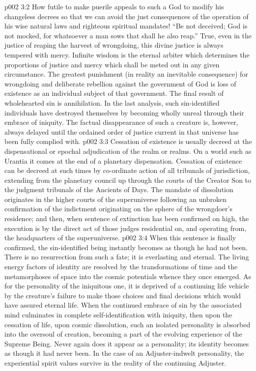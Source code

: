 \vs p002 3:2 \pc How futile to make puerile appeals to such a God to modify his changeless decrees so that we can avoid the just consequences of the operation of his wise natural laws and righteous spiritual mandates! “Be not deceived; God is not mocked, for whatsoever a man sows that shall he also reap.” True, even in the justice of reaping the harvest of wrongdoing, this divine justice is always tempered with mercy. Infinite wisdom is the eternal arbiter which determines the proportions of justice and mercy which shall be meted out in any given circumstance. The greatest punishment (in reality an inevitable consequence) for wrongdoing and deliberate rebellion against the government of God is loss of existence as an individual subject of that government. The final result of wholehearted sin is annihilation. In the last analysis, such sin\hyp{}identified individuals have destroyed themselves by becoming wholly unreal through their embrace of iniquity. The factual disappearance of such a creature is, however, always delayed until the ordained order of justice current in that universe has been fully complied with.
\vs p002 3:3 Cessation of existence is usually decreed at the dispensational or epochal adjudication of the realm or realms. On a world such as Urantia it comes at the end of a planetary dispensation. Cessation of existence can be decreed at such times by co\hyp{}ordinate action of all tribunals of jurisdiction, extending from the planetary council up through the courts of the Creator Son to the judgment tribunals of the Ancients of Days. The mandate of dissolution originates in the higher courts of the superuniverse following an unbroken confirmation of the indictment originating on the sphere of the wrongdoer’s residence; and then, when sentence of extinction has been confirmed on high, the execution is by the direct act of those judges residential on, and operating from, the headquarters of the superuniverse.
\vs p002 3:4 When this sentence is finally confirmed, the sin\hyp{}identified being instantly becomes as though he had not been. There is no resurrection from such a fate; it is everlasting and eternal. The living energy factors of identity are resolved by the transformations of time and the metamorphoses of space into the cosmic potentials whence they once emerged. As for the personality of the iniquitous one, it is deprived of a continuing life vehicle by the creature’s failure to make those choices and final decisions which would have assured eternal life. When the continued embrace of sin by the associated mind culminates in complete self\hyp{}identification with iniquity, then upon the cessation of life, upon cosmic dissolution, such an isolated personality is absorbed into the oversoul of creation, becoming a part of the evolving experience of the Supreme Being. Never again does it appear as a personality; its identity becomes as though it had never been. In the case of an Adjuster\hyp{}indwelt personality, the experiential spirit values survive in the reality of the continuing Adjuster.
